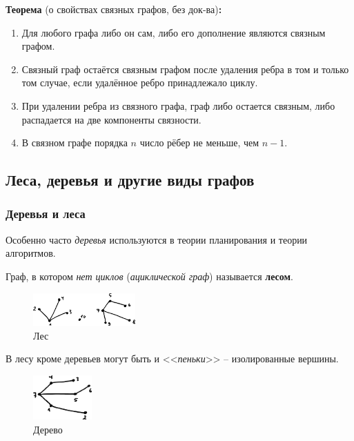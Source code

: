 \documentclass[12pt, a4paper]{article}
\begin{document}
\textbf{Теорема} (о свойствах связных графов, без док-ва)\textbf{:}
\begin{enumerate}
\item Для любого графа либо он сам, либо его дополнение являются связным графом.
\item Связный граф остаётся связным графом после удаления ребра в том и только том случае, если удалённое ребро принадлежало циклу.
\item При удалении ребра из связного графа, граф либо остается связным, либо распадается на две компоненты связности.
\item В связном графе порядка $n$ число рёбер не меньше, чем $n-1$.
\end{enumerate}

\subsection{Леса, деревья и другие виды графов}

\subsubsection{Деревья и леса}

Особенно часто \textit{деревья} используются в теории планирования и теории алгоритмов.

Граф, в котором \textit{нет циклов} (\textit{ациклической граф}) называется \textbf{лесом}. 

\begin{figure}[h]
 \centering
 \includegraphics[width=0.35\textwidth]{39}
 \vspace{-4mm}
 \caption{Лес}
\end{figure}

В лесу кроме деревьев могут быть и <<\textit{пеньки}>> -- изолированные вершины.

\begin{figure}
  \vspace{-5mm}
  \centering
  \includegraphics[width=0.2\textwidth]{40}
  \vspace{-9mm}
 \caption{Дерево}
\end{figure}
\end{document}
